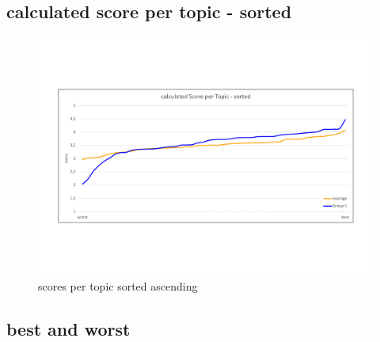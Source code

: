 \subsection{calculated score per topic - sorted}

\begin{figure}[H]
	\centering
	\includegraphics[trim=0 150 0 150, width=\textwidth]{img/score_per_topic_sorted.pdf}
	\caption{scores per topic sorted ascending}
	\label{fig:spts}
\end{figure}

\subsection{best and worst}